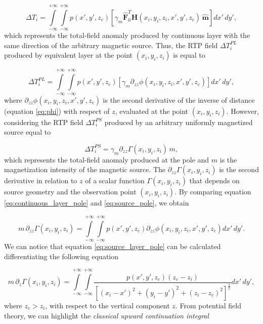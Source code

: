 \begin{equation}
\Delta T_i = \int \limits_{-\infty}^{+\infty } \int \limits_{-\infty}^{+\infty }  p(x',y',z_c)  [\gamma_m \hat{\mathbf{F}}_0^T \mathbf{H}(x_i,y_i,z_i,x',y',z_c) \,\hat{\mathbf{m}}] dx' \,dy',
\label{eq:continuous_layer_source}
\end{equation} 
which represents the total-field anomaly produced by continuous layer with the same direction of the arbitrary magnetic source. Thus, the RTP field $\Delta T_{i}^{PL}$ produced by equivalent layer at the point $(x_i,y_i,z_i)$ is equal to 

\begin{equation}
\Delta T_{i}^{PL} = \int \limits_{-\infty}^{+\infty } \int \limits_{-\infty}^{+\infty }  p(x',y',z_c)  [\gamma_m \partial_{zz} \phi(x_i,y_i,z_i,x',y',z_c) ] dx' \,dy',
\label{eq:continuous_layer_pole}
\end{equation}
where $\partial_{zz} \phi(x_i,y_i,z_i,x',y',z_c)$ is the second derivative of the inverse of distance (equation \ref{eq:phi}) with respect of $z$, evaluated at the point $(x_i,y_i,z_i)$. However, considering the RTP field $\Delta T_{i}^{PS}$ produced by an arbitrary uniformly magnetized source equal to

\begin{equation}
\Delta T_{i}^{PS} = \gamma_m \partial_{zz} \Gamma(x_i,y_i,z_i) \, m,
\label{eq:source_pole}
\end{equation}
which represents the total-field anomaly produced at the pole and $m$ is the magnetization intensity of the magnetic source. The $\partial_{zz} \Gamma(x_i,y_i,z_i)$ is the second derivative in relation to $z$ of a scalar function $\Gamma(x_i,y_i,z_i)$ that depends on source geometry and the observation point $(x_i,y_i,z_i)$. By comparing equation \ref{eq:continuous_layer_pole} and \ref{eq:source_pole}, we obtain 
 
\begin{equation}
m \, \partial_{zz} \Gamma(x_i,y_i,z_i) = \int \limits_{-\infty}^{+\infty } \int \limits_{-\infty}^{+\infty }  p(x',y',z_c)  \partial_{zz} \phi(x_i,y_i,z_i,x',y',z_c)  dx' \,dy'.
\label{eq:source_layer_pole}
\end{equation}
We can notice that equation \ref{eq:source_layer_pole} can be calculated differentiating the following equation

\begin{equation}
m \, \partial_{z} \Gamma(x_i,y_i,z_i) = \int \limits_{-\infty}^{+\infty } \int \limits_{-\infty}^{+\infty }  \dfrac{p(x',y',z_c) (z_c - z_i)}{[(x_i-x')^2 + (y_i-y')^2 + (z_i-z_c)^2]^{\frac{3}{2}}}    dx' \,dy',
\label{eq:mag_upward}
\end{equation}
where $z_c > z_i$, with respect to the vertical component $z$. From potential field theory, we can highlight the \textit{classical upward continuation integral} 

